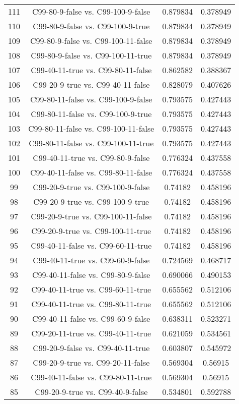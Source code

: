 \documentclass[a4paper,10pt]{article}
\begin{document}
\begin{landscape}
\begin{table}[!htp]
\begin{tabular}{cccc}
111&C99-80-9-false vs. C99-100-9-false&0.879834&0.378949\\
110&C99-80-9-false vs. C99-100-9-true&0.879834&0.378949\\
109&C99-80-9-false vs. C99-100-11-false&0.879834&0.378949\\
108&C99-80-9-false vs. C99-100-11-true&0.879834&0.378949\\
107&C99-40-11-true vs. C99-80-11-false&0.862582&0.388367\\
106&C99-20-9-true vs. C99-40-11-false&0.828079&0.407626\\
105&C99-80-11-false vs. C99-100-9-false&0.793575&0.427443\\
104&C99-80-11-false vs. C99-100-9-true&0.793575&0.427443\\
103&C99-80-11-false vs. C99-100-11-false&0.793575&0.427443\\
102&C99-80-11-false vs. C99-100-11-true&0.793575&0.427443\\
101&C99-40-11-true vs. C99-80-9-false&0.776324&0.437558\\
100&C99-40-11-false vs. C99-80-11-false&0.776324&0.437558\\
99&C99-20-9-true vs. C99-100-9-false&0.74182&0.458196\\
98&C99-20-9-true vs. C99-100-9-true&0.74182&0.458196\\
97&C99-20-9-true vs. C99-100-11-false&0.74182&0.458196\\
96&C99-20-9-true vs. C99-100-11-true&0.74182&0.458196\\
95&C99-40-11-false vs. C99-60-11-true&0.74182&0.458196\\
94&C99-40-11-true vs. C99-60-9-false&0.724569&0.468717\\
93&C99-40-11-false vs. C99-80-9-false&0.690066&0.490153\\
92&C99-40-11-true vs. C99-60-11-true&0.655562&0.512106\\
91&C99-40-11-true vs. C99-80-11-true&0.655562&0.512106\\
90&C99-40-11-false vs. C99-60-9-false&0.638311&0.523271\\
89&C99-20-11-true vs. C99-40-11-true&0.621059&0.534561\\
88&C99-20-9-false vs. C99-40-11-true&0.603807&0.545972\\
87&C99-20-9-true vs. C99-20-11-false&0.569304&0.56915\\
86&C99-40-11-false vs. C99-80-11-true&0.569304&0.56915\\
85&C99-20-9-true vs. C99-40-9-false&0.534801&0.592788\\

\end{tabular}
\end{table}
\end{landscape}
\end{document}
